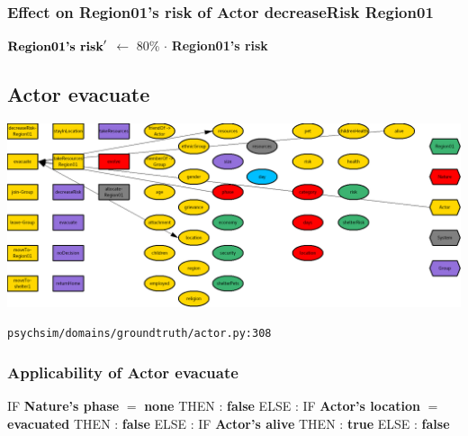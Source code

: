 \documentclass{article}%
\begin{document}
%
\subsubsection{Effect on Region01's risk of Actor decreaseRisk Region01}%
\label{ssubsec:Effect on Region01's risk of Actor decreaseRisk Region01}%
\begin{flushleft}%
$\mbox{\textbf{Region01's risk}} '$%
$\leftarrow$%
80\%%
$\cdot$%
\textbf{Region01's risk}%
\end{flushleft}

%
\subsection{Actor evacuate}%
\label{subsec:Actor evacuate}%
\includegraphics[width=\textwidth]{images/Actor-evacuate.png}%
\begin{flushleft}%
\verb|psychsim/domains/groundtruth/actor.py:308|%
\end{flushleft}%
\subsubsection{Applicability of Actor evacuate}%
\label{ssubsec:Applicability of Actor evacuate}%
\begin{flushleft}%
IF %
\textbf{Nature's phase}%
$=$%
\textbf{none}%
\linebreak%
\hspace*{2em}%
THEN %
: %
\textbf{false}%
\linebreak%
\hspace*{2em}%
ELSE %
: %
IF %
\textbf{Actor's location}%
$=$%
\textbf{evacuated}%
\linebreak%
\hspace*{4em}%
THEN %
: %
\textbf{false}%
\linebreak%
\hspace*{4em}%
ELSE %
: %
IF %
\textbf{Actor's alive}%
\linebreak%
\hspace*{6em}%
THEN %
: %
\textbf{true}%
\linebreak%
\hspace*{6em}%
ELSE %
: %
\textbf{false}%
\end{flushleft}
\end{document}
